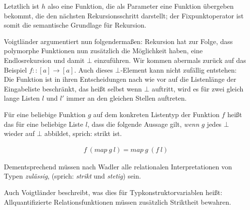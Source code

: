 Letztlich ist $h$ also eine Funktion, die als Parameter eine Funktion übergeben bekommt, die den nächsten Rekursionsschritt
darstellt; der Fixpunktoperator ist somit die semantische Grundlage für Rekursion.

Voigtländer \cite{voigtlander} argumentiert nun folgendermaßen: Rekursion hat zur Folge, dass polymorphe Funktionen
nun zusätzlich die Möglichkeit haben, eine Endlosrekursion und damit $\bot$ einzuführen. Wir kommen abermals zurück auf das
Beispiel $f :: [a] \rightarrow [a]$.
Auch dieses $\bot$-Element kann nicht zufällig entstehen: Die Funktion ist in ihren Entscheidungen nach wie vor auf
die Listenlänge der Eingabeliste beschränkt, das heißt selbst wenn $\bot$ auftritt, wird es für zwei gleich lange Listen
$l$ und $l'$ immer an den gleichen Stellen auftreten.

Für eine beliebige Funktion $g$ auf dem konkreten Listentyp der Funktion $f$ heißt das für eine beliebige Liste $l$, dass die folgende
Aussage gilt, \textit{wenn} $g$ jedes $\bot$ wieder auf $\bot$ abbildet, sprich: strikt ist.

\begin{align*}
f\ (map\ g\ l) = map\ g\ (f\ l)
\end{align*}




Dementsprechend müssen nach Wadler \cite{wadler} alle relationalen Interpretationen von Typen \textit{zulässig}, (sprich: 
\textit{strikt} und \textit{stetig}) sein.

Auch Voigtländer \cite{voigtlander} beschreibt, was dies für Typkonstruktorvariablen heißt: Allquantifizierte Relationsfunktionen müssen zusätzlich
Striktheit bewahren.


